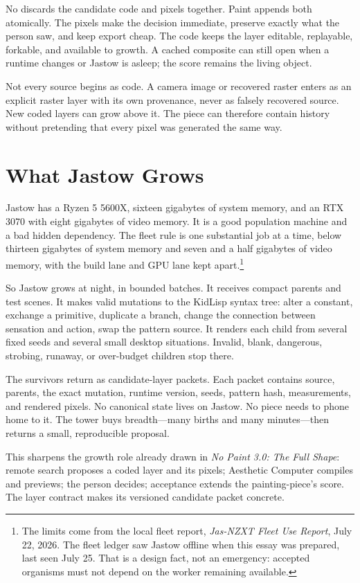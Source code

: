 \documentclass[10pt,letterpaper]{article}
\begin{document}
No discards the candidate code and pixels together. Paint appends both atomically. The pixels make the decision immediate, preserve exactly what the person saw, and keep export cheap. The code keeps the layer editable, replayable, forkable, and available to growth. A cached composite can still open when a runtime changes or Jastow is asleep; the score remains the living object.

Not every source begins as code. A camera image or recovered raster enters as an explicit raster layer with its own provenance, never as falsely recovered source. New coded layers can grow above it. The piece can therefore contain history without pretending that every pixel was generated the same way.

\section{What Jastow Grows}

Jastow has a Ryzen 5 5600X, sixteen gigabytes of system memory, and an RTX 3070 with eight gigabytes of video memory. It is a good population machine and a bad hidden dependency. The fleet rule is one substantial job at a time, below thirteen gigabytes of system memory and seven and a half gigabytes of video memory, with the build lane and GPU lane kept apart.\footnote{The limits come from the local fleet report, \textit{Jas-NZXT Fleet Use Report}, July 22, 2026. The fleet ledger saw Jastow offline when this essay was prepared, last seen July 25. That is a design fact, not an emergency: accepted organisms must not depend on the worker remaining available.}

So Jastow grows at night, in bounded batches. It receives compact parents and test scenes. It makes valid mutations to the KidLisp syntax tree: alter a constant, exchange a primitive, duplicate a branch, change the connection between sensation and action, swap the pattern source. It renders each child from several fixed seeds and several small desktop situations. Invalid, blank, dangerous, strobing, runaway, or over-budget children stop there.

The survivors return as candidate-layer packets. Each packet contains source, parents, the exact mutation, runtime version, seeds, pattern hash, measurements, and rendered pixels. No canonical state lives on Jastow. No piece needs to phone home to it. The tower buys breadth---many births and many minutes---then returns a small, reproducible proposal.

This sharpens the growth role already drawn in \textit{No Paint 3.0: The Full Shape}: remote search proposes a coded layer and its pixels; Aesthetic Computer compiles and previews; the person decides; acceptance extends the painting-piece's score. The layer contract makes its versioned candidate packet concrete.
\end{document}
